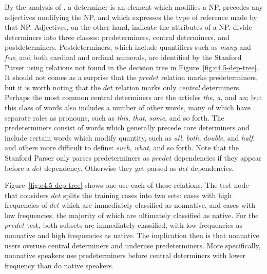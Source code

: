 \documentclass[main.tex]{subfiles}
\begin{document}
By the analysis of \citet[p. 253]{quirk:1985}, a determiner is an element which modifies a NP, precedes any adjectives modifying the NP, and which expresses the type of reference made by that NP. Adjectives, on the other hand, indicate the attributes of a NP. \citeauthor{quirk:1985} divide determiners into three classes: predeterminers, central determiners, and postdeterminers. Postdeterminers, which include quantifiers such as \textit{many} and \textit{few}, and both cardinal and ordinal numerals, are identified by the Stanford Parser using relations not found in the decision tree in Figure~\ref{fig:c4.5-dep-tree}. It should not comes as a surprise that the $predet$ relation marks predeterminers, but it is worth noting that the $det$ relation marks only \textit{central} determiners. Perhaps the most common central determiners are the articles \textit{the}, \textit{a}, and \textit{an}; but this class of words also includes a number of other words, many of which have separate roles as pronouns, such as \textit{this}, \textit{that}, \textit{some}, and so forth. The predeterminers consist of words which generally precede core determiners and include certain words which modify quantity, such as \textit{all}, \textit{both}, \textit{double}, and \textit{half}, and others more difficult to define: \textit{such}, \textit{what}, and so forth. Note that the Stanford Parser only parses predeterminers as $predet$ dependencies if they appear before a $det$ dependency. Otherwise they get parsed as $det$ dependencies.

Figure~\ref{fig:c4.5-dep-tree} shows one use each of these relations. The test node that considers $det$ splits the training cases into two sets: cases with high frequencies of $det$ which are immediately classified as nonnative, and cases with low frequencies, the majority of which are ultimately classified as native. For the $predet$ test, both subsets are immediately classified, with low frequencies as nonnative and high frequencies as native. The implication then is that nonnative users overuse central determiners and underuse predeterminers. More specifically, nonnative speakers use predeterminers before central determiners with lower frequency than do native speakers.
\end{document}
